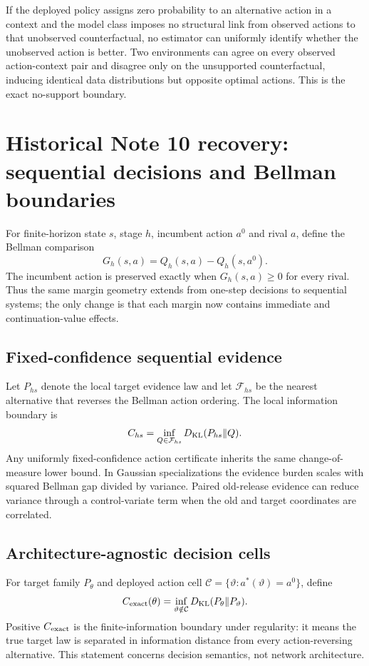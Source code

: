 \documentclass[11pt,letterpaper]{article}
\theoremstyle{plain}
\newcommand{\1}{\mathbf 1}
\begin{document}
If the deployed policy assigns zero probability to an alternative action in a context and the model class imposes no structural link from observed actions to that unobserved counterfactual, no estimator can uniformly identify whether the unobserved action is better. Two environments can agree on every observed action-context pair and disagree only on the unsupported counterfactual, inducing identical data distributions but opposite optimal actions. This is the exact no-support boundary.

\clearpage
\section{Historical Note 10 recovery: sequential decisions and Bellman boundaries}
For finite-horizon state $s$, stage $h$, incumbent action $a^0$ and rival $a$, define the Bellman comparison
\begin{equation}
 G_h(s,a)=Q_h(s,a)-Q_h(s,a^0).
\end{equation}
The incumbent action is preserved exactly when $G_h(s,a)\ge0$ for every rival. Thus the same margin geometry extends from one-step decisions to sequential systems; the only change is that each margin now contains immediate and continuation-value effects.

\subsection{Fixed-confidence sequential evidence}
Let $P_{hs}$ denote the local target evidence law and let $\mathcal F_{hs}$ be the nearest alternative that reverses the Bellman action ordering. The local information boundary is
\begin{equation}
 C_{hs}=\inf_{Q\in\mathcal F_{hs}}D_{\rm KL}(P_{hs}\Vert Q).
\end{equation}
Any uniformly fixed-confidence action certificate inherits the same change-of-measure lower bound. In Gaussian specializations the evidence burden scales with squared Bellman gap divided by variance. Paired old-release evidence can reduce variance through a control-variate term when the old and target coordinates are correlated.

\subsection{Architecture-agnostic decision cells}
For target family $P_\theta$ and deployed action cell $\mathcal C=\{\vartheta:a^*(\vartheta)=a^0\}$, define
\begin{equation}
 C_{\rm exact}(\theta)=\inf_{\vartheta\notin\mathcal C}D_{\rm KL}(P_\theta\Vert P_\vartheta).
\end{equation}
Positive $C_{\rm exact}$ is the finite-information boundary under regularity: it means the true target law is separated in information distance from every action-reversing alternative. This statement concerns decision semantics, not network architecture.
\end{document}

